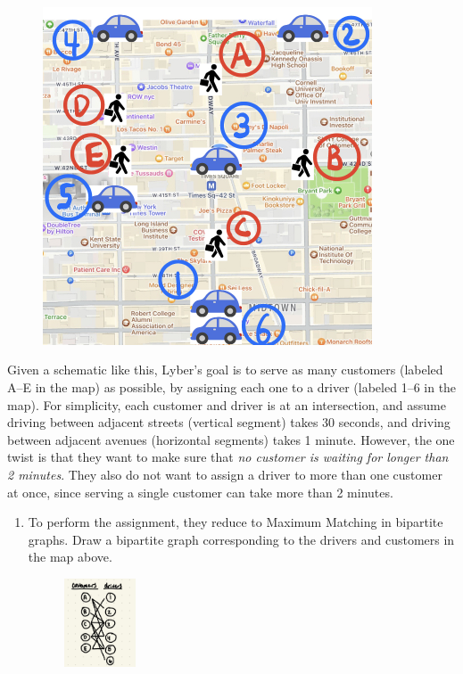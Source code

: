 \documentclass[11pt]{article}
\begin{document}
\begin{enumerate}
    \begin{figure}[H]
        \centering
        \includegraphics[width=0.87\textwidth]{NYC-map-zoomed-light.jpeg}
        \label{fig:travel_time_graph}
    \end{figure}

    Given a schematic like this, Lyber's goal is to serve as many customers (labeled A--E in the map) as possible, by assigning each one to a driver (labeled 1--6 in the map). For simplicity, each customer and driver is at an intersection, and assume driving between adjacent streets (vertical segment) takes 30 seconds, and driving between adjacent avenues (horizontal segments) takes 1 minute. However, the one twist is that they want to make sure that \textit{no customer is waiting for longer than 2 minutes}.  They also do not want to assign a driver to more than one customer at once, since serving a single customer can take more than 2 minutes.

    \begin{enumerate}
        \item To perform the assignment, they reduce to Maximum Matching in bipartite graphs.  Draw a bipartite graph corresponding to the drivers and customers in the map above.
        \begin{figure}[H]
            \centering
            \includegraphics[width=0.2\textwidth]{IMG_0109.png}
            \label{fig:pic1}
        \end{figure}
    

\end{enumerate}
\end{enumerate}
\end{document}
